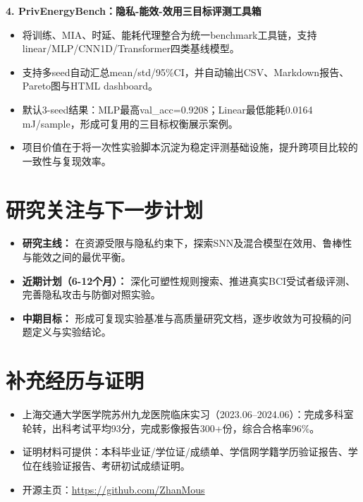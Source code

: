 \documentclass[11pt,a4paper]{ctexart}
\begin{document}
\textbf{4. PrivEnergyBench：隐私-能效-效用三目标评测工具箱}
\begin{itemize}
  \item 将训练、MIA、时延、能耗代理整合为统一benchmark工具链，支持linear/MLP/CNN1D/Transformer四类基线模型。
  \item 支持多seed自动汇总mean/std/95\%CI，并自动输出CSV、Markdown报告、Pareto图与HTML dashboard。
  \item 默认3-seed结果：MLP最高val\_acc=0.9208；Linear最低能耗0.0164 mJ/sample，形成可复用的三目标权衡展示案例。
  \item 项目价值在于将一次性实验脚本沉淀为稳定评测基础设施，提升跨项目比较的一致性与复现效率。
\end{itemize}

\section*{研究关注与下一步计划}
\begin{itemize}
  \item \textbf{研究主线：} 在资源受限与隐私约束下，探索SNN及混合模型在效用、鲁棒性与能效之间的最优平衡。
  \item \textbf{近期计划（6-12个月）：} 深化可塑性规则搜索、推进真实BCI受试者级评测、完善隐私攻击与防御对照实验。
  \item \textbf{中期目标：} 形成可复现实验基准与高质量研究文档，逐步收敛为可投稿的问题定义与实验结论。
\end{itemize}

\section*{补充经历与证明}
\begin{itemize}
  \item 上海交通大学医学院苏州九龙医院临床实习（2023.06--2024.06）：完成多科室轮转，出科考试平均93分，完成影像报告300+份，综合合格率96\%。
  \item 证明材料可提供：本科毕业证/学位证/成绩单、学信网学籍学历验证报告、学位在线验证报告、考研初试成绩证明。
  \item 开源主页：\href{https://github.com/ZhanMous}{https://github.com/ZhanMous}
\end{itemize}
\end{document}
